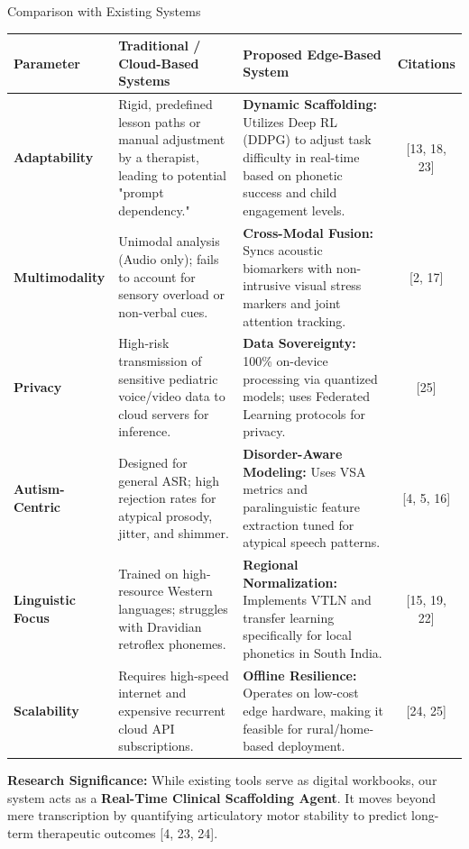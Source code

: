 \documentclass[aspectratio=169, 11pt]{beamer}
\begin{document}
\begin{frame}{Comparison with Existing Systems}
    \tiny
    \centering
    \renewcommand{\arraystretch}{1.2}
    \setlength{\tabcolsep}{3pt}
    \begin{tabularx}{\textwidth}{|l|L|L|c|}
        \hline
        \textbf{Parameter} & \textbf{Traditional / Cloud-Based Systems} & \textbf{Proposed Edge-Based System} & \textbf{Citations} \\ \hline
        
        \textbf{Adaptability} & Rigid, predefined lesson paths or manual adjustment by a therapist, leading to potential "prompt dependency." & \textbf{Dynamic Scaffolding:} Utilizes Deep RL (DDPG) to adjust task difficulty in real-time based on phonetic success and child engagement levels. & [13, 18, 23] \\ \hline
        
        \textbf{Multimodality} & Unimodal analysis (Audio only); fails to account for sensory overload or non-verbal cues. & \textbf{Cross-Modal Fusion:} Syncs acoustic biomarkers with non-intrusive visual stress markers and joint attention tracking. & [2, 17] \\ \hline
        
        \textbf{Privacy} & High-risk transmission of sensitive pediatric voice/video data to cloud servers for inference. & \textbf{Data Sovereignty:} 100\% on-device processing via quantized models; uses Federated Learning protocols for privacy. & [25] \\ \hline
        
        \textbf{Autism-Centric} & Designed for general ASR; high rejection rates for atypical prosody, jitter, and shimmer. & \textbf{Disorder-Aware Modeling:} Uses VSA metrics and paralinguistic feature extraction tuned for atypical speech patterns. & [4, 5, 16] \\ \hline
        
        \textbf{Linguistic Focus} & Trained on high-resource Western languages; struggles with Dravidian retroflex phonemes. & \textbf{Regional Normalization:} Implements VTLN and transfer learning specifically for local phonetics in South India. & [15, 19, 22] \\ \hline
        
        \textbf{Scalability} & Requires high-speed internet and expensive recurrent cloud API subscriptions. & \textbf{Offline Resilience:} Operates on low-cost edge hardware, making it feasible for rural/home-based deployment. & [24, 25] \\ \hline
    \end{tabularx}
    
    \vspace{3mm}
    \begin{block}{}
        \scriptsize \textbf{Research Significance:} While existing tools serve as digital workbooks, our system acts as a \textbf{Real-Time Clinical Scaffolding Agent}. It moves beyond mere transcription by quantifying articulatory motor stability to predict long-term therapeutic outcomes [4, 23, 24].
    \end{block}
\end{frame}
\end{document}
